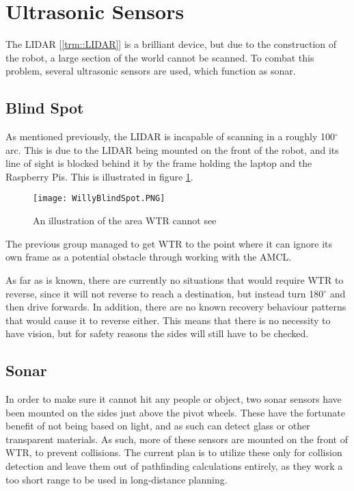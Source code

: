 \section{Ultrasonic Sensors}
The LIDAR [\ref{trm::LIDAR}] is a brilliant device, but due to the construction of the robot, a large section of the world cannot be scanned.
To combat this problem, several ultrasonic sensors are used, which function as sonar.

\subsection{Blind Spot}
As mentioned previously, the LIDAR is incapable of scanning in a roughly 100$^\circ$ arc.
This is due to the LIDAR being mounted on the front of the robot, and its line of sight is blocked behind it by the frame holding the laptop and the Raspberry Pis.
This is illustrated in figure \ref{fig::blindspot}.

\begin{figure}[H]
\centering
\texttt{[image: WillyBlindSpot.PNG]}
\caption{An illustration of the area WTR cannot see}
\label{fig::blindspot}
\end{figure}

The previous group managed to get WTR to the point where it can ignore its own frame as a potential obstacle through working with the AMCL.

As far as is known, there are currently no situations that would require WTR to reverse, since it will not reverse to reach a destination, but instead turn 180$^{\circ}$ and then drive forwards.
In addition, there are no known recovery behaviour patterns that would cause it to reverse either.
This means that there is no necessity to have vision, but for safety reasons the sides will still have to be checked.


\subsection{Sonar}
In order to make sure it cannot hit any people or object, two sonar sensors have been mounted on the sides just above the pivot wheels.
These have the fortunate benefit of not being based on light, and as such can detect glass or other transparent materials.
As such, more of these sensors are mounted on the front of WTR, to prevent collisions.
The current plan is to utilize these only for collision detection and leave them out of pathfinding calculations entirely, as they work a too short range to be used in long-distance planning.

